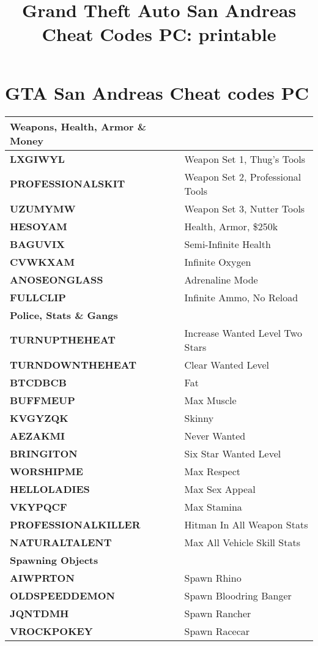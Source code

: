 \documentclass{article}
\title{Grand Theft Auto San Andreas Cheat Codes PC: printable}
\date{}
\begin{document}
\section*{GTA San Andreas Cheat codes PC}
\begin{small}
	\begin{longtable}{|l l|}
	\hline
	\textbf{Weapons, Health, Armor \& Money}& \\
	\hline
	\textbf{LXGIWYL }& Weapon Set 1, Thug's Tools \\
	\textbf{PROFESSIONALSKIT }& Weapon Set 2, Professional Tools \\
	\textbf{UZUMYMW }& Weapon Set 3, Nutter Tools \\
	\textbf{HESOYAM }& Health, Armor, \$250k \\
	\textbf{BAGUVIX }& Semi-Infinite Health \\
	\textbf{CVWKXAM }& Infinite Oxygen \\
	\textbf{ANOSEONGLASS }& Adrenaline Mode \\
	\textbf{FULLCLIP }& Infinite Ammo, No Reload \\
	\hline
	\hline
	\textbf{Police, Stats \& Gangs}& \\
	\hline
	\textbf{TURNUPTHEHEAT }& Increase Wanted Level Two Stars \\
	\textbf{TURNDOWNTHEHEAT }& Clear Wanted Level \\
	\textbf{BTCDBCB }& Fat \\
	\textbf{BUFFMEUP }& Max Muscle \\
	\textbf{KVGYZQK }& Skinny \\
	\textbf{AEZAKMI }& Never Wanted \\
	\textbf{BRINGITON }& Six Star Wanted Level \\
	\textbf{WORSHIPME }& Max Respect \\
	\textbf{HELLOLADIES }& Max Sex Appeal \\
	\textbf{VKYPQCF }& Max Stamina \\
	\textbf{PROFESSIONALKILLER }& Hitman In All Weapon Stats \\
	\textbf{NATURALTALENT }& Max All Vehicle Skill Stats \\
	\hline
	\hline
	\textbf{Spawning Objects}& \\
	\hline
	\textbf{AIWPRTON }& Spawn Rhino \\
	\textbf{OLDSPEEDDEMON }& Spawn Bloodring Banger \\
	\textbf{JQNTDMH }& Spawn Rancher \\
	\textbf{VROCKPOKEY }& Spawn Racecar \\

\end{longtable}
\end{small}
\end{document}
